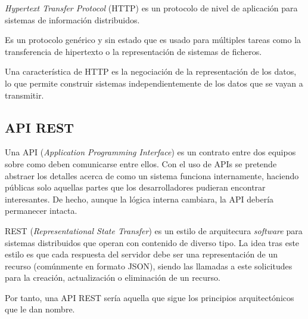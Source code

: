 \emph{Hypertext Transfer Protocol} (HTTP) es un protocolo de nivel de aplicación para sistemas de información distribuidos.

Es un protocolo genérico y sin estado que es usado para múltiples tareas como la transferencia de hipertexto o la representación de sistemas de ficheros.

Una característica de HTTP es la negociación de la representación de los datos, lo que permite construir sistemas independientemente de los datos que se vayan a transmitir. \emph{\parencite{Reference26}}

\subsection{API REST}

Una API (\emph{Application Programming Interface}) es un contrato entre dos equipos sobre como deben comunicarse entre ellos. Con el uso de APIs se pretende abstraer los detalles acerca de como un sistema funciona internamente, haciendo públicas solo aquellas partes que los desarrolladores pudieran encontrar interesantes. De hecho, aunque la lógica interna cambiara, la API debería permanecer intacta. \emph{\parencite{Reference27}}

REST (\emph{Representational State Transfer}) es un estilo de arquitecura \emph{software} para sistemas distribuidos que operan con contenido de diverso tipo. La idea tras este estilo es que cada respuesta del servidor debe ser una representación de un recurso (comúnmente en formato JSON), siendo las llamadas a este solicitudes para la creación, actualización o eliminación de un recurso. \emph{\parencite{Reference28}}

Por tanto, una API REST sería aquella que sigue los principios arquitectónicos que le dan nombre.
